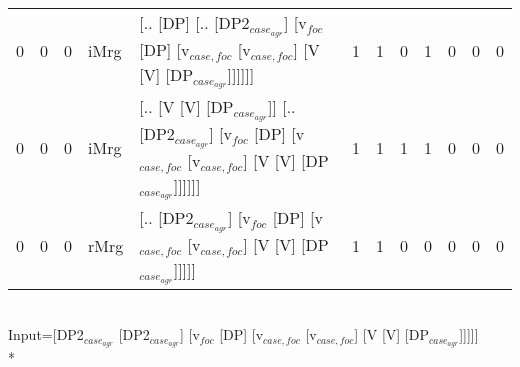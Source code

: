 \begin{tabularx}{\linewidth}{rrrlXrrrrrrr}
   0 &       0 &   0 & iMrg & [.. [DP] [.. [DP2$_{case_{agr}}$] [v$_{foc}$ [DP] [v$_{case,foc}$ [v$_{case,foc}$] [V [V] [DP$_{case_{agr}}$]]]]]]                                                         &             1 &             1 &                  0 &            1 &              0 &             0 &          0 \\
   0 &       0 &   0 & iMrg & [.. [V [V] [DP$_{case_{agr}}$]] [.. [DP2$_{case_{agr}}$] [v$_{foc}$ [DP] [v$_{case,foc}$ [v$_{case,foc}$] [V [V] [DP$_{case_{agr}}$]]]]]]                                        &             1 &             1 &                  1 &            1 &              0 &             0 &          0 \\
   0 &       0 &   0 & rMrg & [.. [DP2$_{case_{agr}}$] [v$_{foc}$ [DP] [v$_{case,foc}$ [v$_{case,foc}$] [V [V] [DP$_{case_{agr}}$]]]]]                                                                   &             1 &             1 &                  0 &            0 &              0 &             0 &          0 \\
\hline
\end{tabularx}\endgroup\\
\begingroup\scriptsize Input=[DP2$_{case_{agr}}$ [DP2$_{case_{agr}}$] [v$_{foc}$ [DP] [v$_{case,foc}$ [v$_{case,foc}$] [V [V] [DP$_{case_{agr}}$]]]]]\\*

